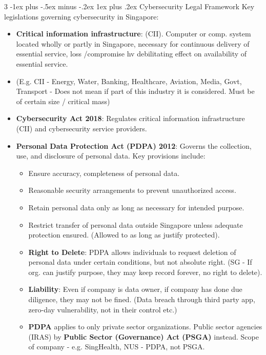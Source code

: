 \documentclass[10pt, landscape]{article}
\makeatletter
\renewcommand{\subsubsection}{\@startsection{subsubsection}{3}{0mm}%
                                {-1ex plus -.5ex minus -.2ex}%
                                {1ex plus .2ex}%
                                {\normalfont\small\bfseries}}
\makeatother
\begin{document}
\begin{multicols*}{3}
\subsubsection{Cybersecurity Legal Framework}
Key legislations governing cybersecurity in Singapore:
\begin{itemize}[itemsep=0pt, topsep=0pt]
\item \textbf{Critical information infrastructure}: (CII). Computer or comp. system located wholly or partly in 
Singapore, necessary for continuous delivery of essential service, loss /compromise hv debilitating effect on availability of essential service.
\item (E.g. CII - Energy, Water, Banking, Healthcare, Aviation, Media, Govt, Transport - Does not mean if part of this industry it is considered. Must be of certain size / critical mass)
\item \textbf{Cybersecurity Act 2018}: Regulates critical information infrastructure (CII) and cybersecurity service providers. 
\item \textbf{Personal Data Protection Act (PDPA) 2012}: Governs the collection, use, and disclosure of personal data. Key provisions include:
	\begin{itemize}[itemsep=0pt, topsep=0pt]
	\item Ensure accuracy, completeness of personal data.
	\item Reasonable security arrangements to prevent unauthorized access.
	\item Retain personal data only as long as necessary for intended purpose.
	\item Restrict transfer of personal data outside Singapore unless adequate protection ensured. (Allowed to as long as justify protected).
	\item \textbf{Right to Delete}: PDPA allows individuals to request deletion of personal data under certain conditions, but not absolute right. (SG - If org. can justify purpose, they may keep record forever, no right to delete).
	\item \textbf{Liability}: Even if company is data owner, if company has done due diligence, they may not be fined. (Data breach through third party app, zero-day vulnerability, not in their control etc.)
	\item \textbf{PDPA} applies to only private sector organizations. Public sector agencies (IRAS) by \textbf{Public Sector (Governance) Act (PSGA)} instead. Scope of company - e.g. SingHealth, NUS - PDPA, not PSGA.
	\end{itemize}

\end{itemize}
\end{multicols*}
\end{document}
